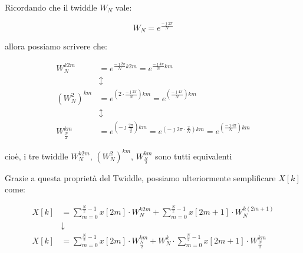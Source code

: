 \begin{tcolorbox}
Ricordando che il twiddle $W_N$ vale: 

{
    \Large 
    \begin{equation}
        W_N = e^{\frac{-\jmath 2 \pi}{N}}
    \end{equation}
}

allora possiamo scrivere che: 

{
    \Large 
    \begin{equation}
        \begin{split}
            W_N^{k2m} 
            &= 
            e^{\frac{-\jmath 2 \pi}{N} k 2 m}
            = 
            e^{\frac{-\jmath 4 \pi}{N} k m}
            \\
            &\updownarrow
            \\
            \left( W_{N}^{2} \right)^{km}
            &= 
            e^{\left(2 \cdot \frac{-\jmath 2 \pi}{N}\right) k  m} 
            = 
            e^{\left(\frac{-\jmath 4 \pi}{N}\right) k  m} 
            \\
            &\updownarrow
            \\
            W_{\frac{N}{2}}^{km}
            &=
            e^{\left(- \jmath \frac{2 \pi}{\frac{N}{2}} \right) km}
            = 
            e^{\left(- \jmath 2 \pi \cdot \frac{2}{N} \right) km}
            = 
            e^{\left( \frac{- \jmath 4 \pi}{N} \right) km}
        \end{split}
    \end{equation}
}

cioè, i tre twiddle $W_N^{k2m}$, $ \left( W_{N}^{2} \right)^{km}$, $W_{\frac{N}{2}}^{km}$ sono tutti equivalenti 
\end{tcolorbox}

Grazie a questa proprietà del Twiddle, possiamo ulteriormente semplificare $X \left[ k\right]$ come: 

{
    \Large 
    \begin{equation}
        \begin{split}
        X \left[ k\right]       
        &= 
        \sum_{m = 0}^{\frac{N}{2} - 1}
        x \left[ 2m\right]
        \cdot 
        W_{N}^{k2m} 
        + 
        \sum_{m = 0}^{\frac{N}{2} - 1}
        x \left[ 2m + 1\right]
        \cdot 
        W_{N}^{k \left( 2m + 1\right)} 
        \\
        &\downarrow
        \\
        X \left[ k\right]       
        &= 
        \sum_{m = 0}^{\frac{N}{2} - 1}
        x \left[ 2m\right]
        \cdot 
        W_{\frac{N}{2}}^{km} 
        + 
        W_{N}^{k}
        \cdot
        \sum_{m = 0}^{\frac{N}{2} - 1}
        x \left[ 2m + 1\right]
        \cdot 
        W_{\frac{N}{2}}^{k m} 
        \end{split}
    \end{equation}
}

